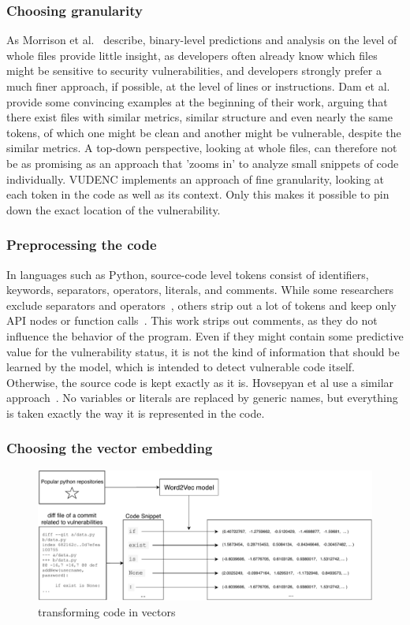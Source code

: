 \documentclass[
a4paper,
pagesize,
pdftex,
12pt,
ngerman,
fleqn,
final,
]{scrartcl}
\begin{document}
	\subsubsection{Choosing granularity}
	As Morrison  et al.~\cite{Morrison.2015} describe, binary-level predictions and analysis on the level of whole files provide little insight, as developers often already know which files might be sensitive to security vulnerabilities, and developers strongly prefer a much finer approach, if possible, at the level of lines or instructions. Dam et al.\cite{Dam.2017} provide some convincing examples at the beginning of their work, arguing that there exist files with similar metrics, similar structure and even nearly the same tokens, of which one might be clean and another might be vulnerable, despite the similar metrics. A top-down perspective, looking at whole files, can therefore not be as promising as an approach that 'zooms in' to analyze small snippets of code individually. VUDENC implements an approach of fine granularity, looking at each token in the code as well as its context. Only this makes it possible to pin down the exact location of the vulnerability. 
	
	\subsubsection{Preprocessing the code}
	In languages such as Python, source-code level tokens consist of identifiers, keywords, separators, operators, literals, and comments. While some researchers exclude separators and operators~\cite{Pang.2015}, others strip out a lot of tokens and keep only API nodes or function calls~\cite{Yamaguchi.2012}. This work strips out comments, as they do not influence the behavior of the program. Even if they might contain some predictive value for the vulnerability status, it is not the kind of information that should be learned by the model, which is intended to detect vulnerable code itself. Otherwise, the source code is kept exactly as it is. Hovsepyan et al use a similar approach~\cite{Hovsepyan.2012}. No variables or literals are replaced by generic names, but everything is taken exactly the way it is represented in the code. 
	
	\subsubsection{Choosing the vector embedding}
	\begin{figure}[ht]
		\centering
		\includegraphics[width=\linewidth]{img/Word2Vec}
		\caption{transforming code in vectors}
		\label{fig:word2vec}
	\end{figure}
	
\end{document}
